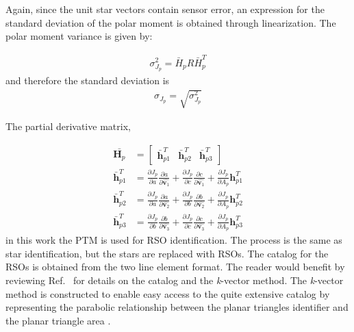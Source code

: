 \documentclass[]{aiaa-tc}%
\begin{document}
Again, since the unit star vectors contain sensor error, an expression for the standard deviation of the polar moment is obtained through linearization. The polar moment variance is given by:

\begin{align}
\sigma^2_{J_{p}} = \bar{H}_p R \bar{H}^T_p  \label{polar_covar}
\end{align}
and therefore the standard deviation is 
\begin{align}
\sigma_{J_{p}} = \sqrt{\sigma_{J_{p}}^2}\label{polar_STD} 
\end{align}

The partial derivative matrix, 

\begin{subequations}
\begin{align}
\bar{\textbf{H}_p} &= 
\begin{bmatrix}
\bar{\textbf{h}}^T_{p1} & \bar{\textbf{h}}^T_{p2}& \bar{\textbf{h}}^T_{p3}
\end{bmatrix}\\
\bar{\textbf{h}}^T_{p1} &= \frac{\partial J_p}{\partial a} \frac{\partial a}{\partial{\hat{\textbf{v}_1}}} + \frac{\partial J_p}{\partial c} \frac{\partial c}{\partial {\hat{\textbf{v}_1}}} + \frac{\partial J_p}{\partial A_p}  \textbf{h}^T_{p1}\\
\bar{\textbf{h}}^T_{p2} &= \frac{\partial J_p}{\partial a} \frac{\partial a}{\partial{\hat{\textbf{v}_2}}} + \frac{\partial J_p}{\partial b} \frac{\partial b}{\partial {\hat{\textbf{v}_2}}} + \frac{\partial J_p}{\partial A_p}  \textbf{h}^T_{p2}\\
\bar{\textbf{h}}^T_{p3} &= \frac{\partial J_p}{\partial b} \frac{\partial b}{\partial{\hat{\textbf{v}_3}}} + \frac{\partial J_p}{\partial c} \frac{\partial c}{\partial {\hat{\textbf{v}_3}}} + \frac{\partial J_p}{\partial A_p}  \textbf{h}^T_{p3}
\end{align}
\end{subequations}
in this work the PTM is used for RSO identification. The process is the same as star identification, but the stars are replaced with RSOs. The catalog for the RSOs is obtained from the two line element format. The reader would benefit by reviewing Ref.~ for details on the catalog  and the \textit{k}-vector method. The \textit{k}-vector method is constructed to enable easy access to the quite extensive catalog by representing the parabolic relationship between the planar triangles identifier and the planar triangle area \cite{cole_fast_2006,PTM}.\\
\end{document}
